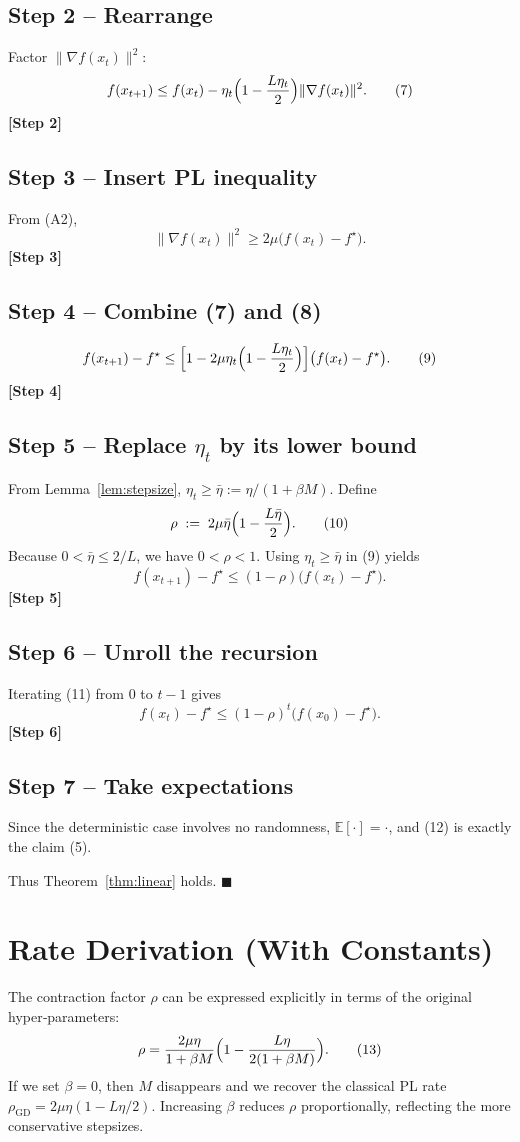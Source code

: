 \documentclass{article}
\newcommand{\EE}{\mathbb{E}}
\begin{document}
\subsection*{Step 2 – Rearrange}
Factor $\|\nabla f(x_{t})\|^{2}$:
\[
f(x_{t+1})\le f(x_{t})-
\eta_{t}\Bigl(1-\frac{L\eta_{t}}{2}\Bigr)\|\nabla f(x_{t})\|^{2}.
\tag{7}
\]
\textbf{[Step 2]}

\subsection*{Step 3 – Insert PL inequality}
From (A2),
\[
\|\nabla f(x_{t})\|^{2}\ge 2\mu\bigl(f(x_{t})-f^{\star}\bigr).
\tag{8}
\]
\textbf{[Step 3]}

\subsection*{Step 4 – Combine (7) and (8)}
\[
f(x_{t+1})-f^{\star}
\le\Bigl[1-2\mu\eta_{t}\Bigl(1-\frac{L\eta_{t}}{2}\Bigr)\Bigr]\bigl(f(x_{t})-f^{\star}\bigr).
\tag{9}
\]
\textbf{[Step 4]}

\subsection*{Step 5 – Replace $\eta_{t}$ by its lower bound}
From Lemma~\ref{lem:stepsize}, $\eta_{t}\ge\bar\eta:=\eta/(1+\beta M)$. Define
\[
\rho\;:=\;2\mu\bar\eta\Bigl(1-\frac{L\bar\eta}{2}\Bigr).
\tag{10}
\]
Because $0<\bar\eta\le 2/L$, we have $0<\rho<1$. Using $\eta_{t}\ge\bar\eta$ in (9) yields
\[
f(x_{t+1})-f^{\star}
\le (1-\rho)\bigl(f(x_{t})-f^{\star}\bigr).
\tag{11}
\]
\textbf{[Step 5]}

\subsection*{Step 6 – Unroll the recursion}
Iterating (11) from $0$ to $t-1$ gives
\[
f(x_{t})-f^{\star}
\le (1-\rho)^{t}\bigl(f(x_{0})-f^{\star}\bigr).
\tag{12}
\]
\textbf{[Step 6]}

\subsection*{Step 7 – Take expectations}
Since the deterministic case involves no randomness, $\EE[\cdot]=\cdot$, and (12) is exactly the claim (5).

Thus Theorem~\ref{thm:linear} holds. \hfill $\blacksquare$

\section*{Rate Derivation (With Constants)}
The contraction factor $\rho$ can be expressed explicitly in terms of the original hyper‑parameters:
\[
\rho
= \frac{2\mu\eta}{1+\beta M}
\Bigl(1-\frac{L\eta}{2(1+\beta M)}\Bigr).
\tag{13}
\]
If we set $\beta=0$, then $M$ disappears and we recover the classical PL rate
$\rho_{\text{GD}}=2\mu\eta(1-L\eta/2)$.  
Increasing $\beta$ reduces $\rho$ proportionally, reflecting the more conservative stepsizes.
\end{document}
